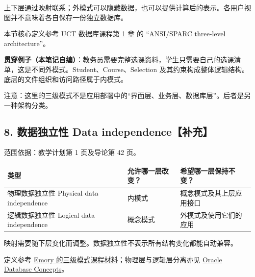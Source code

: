 上下层通过映射联系；外模式可以隐藏数据，也可以提供计算后的表示。各用户视图并不意味着各自保存一份独立数据库。

本节核心定义参考 \href{https://www.cs.uct.ac.za/mit_notes/database/htmls/chp01.html}{UCT 数据库课程第 1 章} 的 ``ANSI/SPARC three-level architecture''。

\textbf{贯穿例子（本笔记自编）}：教务员需要完整选课资料，学生只需要自己的选课清单，这是不同外模式。Student、Course、Selection 及其约束构成整体逻辑结构。底层的文件组织和访问路径属于内模式。

注意：这里的三级模式不是应用部署中的``界面层、业务层、数据库层''。后者是另一种架构分类。

\subsection{8. 数据独立性 Data independence【补充】}\label{01_database_fundamentals_zh-ux6570ux636eux72ecux7acbux6027-data-independenceux8865ux5145}

范围依据：教学计划第 1 页及导论第 42 页。

\begin{longtable}[]{@{}
  >{\raggedright\arraybackslash}p{}
  >{\raggedright\arraybackslash}p{}
  >{\raggedright\arraybackslash}p{}@{}}
\toprule\noalign{}
\begin{minipage}[b]{\linewidth}\raggedright
类型
\end{minipage} & \begin{minipage}[b]{\linewidth}\raggedright
允许哪一层改变？
\end{minipage} & \begin{minipage}[b]{\linewidth}\raggedright
希望哪一层保持不变？
\end{minipage} \\
\midrule\noalign{}
\endhead
\bottomrule\noalign{}
\endlastfoot
物理数据独立性 Physical data independence & 内模式 & 概念模式及其上层应用接口 \\
逻辑数据独立性 Logical data independence & 概念模式 & 外模式及使用它们的应用 \\
\end{longtable}

映射需要随下层变化而调整。数据独立性不表示所有结构变化都能自动兼容。

定义参考 \href{https://www.cs.emory.edu/~cheung/Courses/377/Syllabus/1-files/3-schemas.html}{Emory 的三级模式课程材料}；物理层与逻辑层分离亦见 \href{https://docs.oracle.com/en/database/oracle/oracle-database/19/cncpt/introduction-to-oracle-database.html}{Oracle Database Concepts}。

